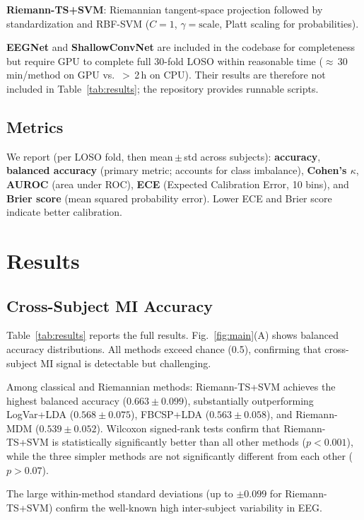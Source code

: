 \documentclass[conference]{IEEEtran}
\begin{document}
\textbf{Riemann-TS+SVM}: Riemannian tangent-space projection
\cite{congedo2017riemannian} followed by standardization and RBF-SVM
($C=1$, $\gamma=\text{scale}$, Platt scaling for probabilities).

\textbf{EEGNet} \cite{lawhern2018eegnet} and \textbf{ShallowConvNet}
\cite{schirrmeister2017deep} are included in the codebase for completeness
but require GPU to complete full 30-fold LOSO within reasonable time
($\approx$\,30\,min/method on GPU vs.\ $>$\,2\,h on CPU). Their results
are therefore not included in Table~\ref{tab:results}; the repository
provides runnable scripts.

\subsection{Metrics}
We report (per LOSO fold, then mean\,$\pm$\,std across subjects):
\textbf{accuracy}, \textbf{balanced accuracy} (primary metric; accounts for
class imbalance), \textbf{Cohen's $\kappa$}, \textbf{AUROC} (area under ROC),
\textbf{ECE} (Expected Calibration Error, 10 bins), and \textbf{Brier score}
(mean squared probability error). Lower ECE and Brier score indicate better
calibration.

\section{Results}
\label{sec:results}

\subsection{Cross-Subject MI Accuracy}

Table~\ref{tab:results} reports the full results. Fig.~\ref{fig:main}(A)
shows balanced accuracy distributions. All methods exceed chance (0.5),
confirming that cross-subject MI signal is detectable but challenging.

Among classical and Riemannian methods:
Riemann-TS+SVM achieves the highest balanced accuracy ($0.663 \pm 0.099$),
substantially outperforming LogVar+LDA ($0.568 \pm 0.075$), FBCSP+LDA
($0.563 \pm 0.058$), and Riemann-MDM ($0.539 \pm 0.052$). Wilcoxon signed-rank
tests confirm that Riemann-TS+SVM is statistically significantly better than
all other methods ($p < 0.001$), while the three simpler methods are not
significantly different from each other ($p > 0.07$).

The large within-method standard deviations (up to $\pm 0.099$ for
Riemann-TS+SVM) confirm the well-known high inter-subject variability in EEG.
\end{document}
